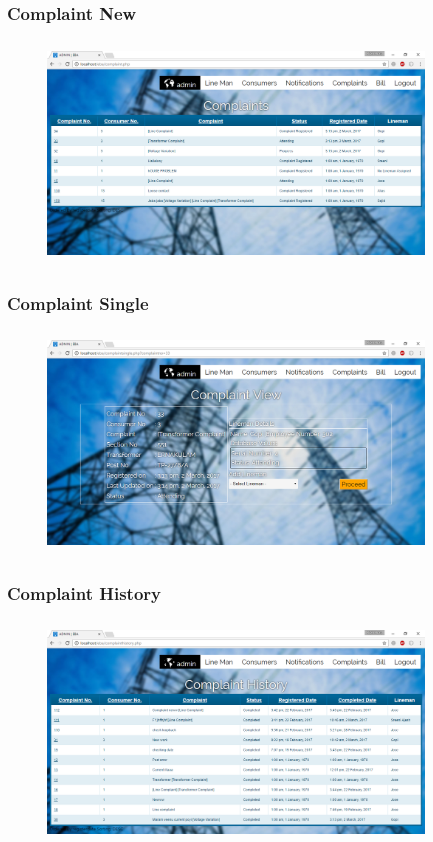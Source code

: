 \documentclass{beamer} %
\theoremstyle{definition} %
\begin{document}
\begin{frame}
\frametitle{Complaint New}
\begin{figure}[center]
\includegraphics[width=10cm ,height=5.9cm]{complaintnew.png} 
\end{figure}
\end{frame}

\begin{frame}
\frametitle{Complaint Single}
\begin{figure}[center]
\includegraphics[width=10cm ,height=5.9cm]{complaintsingle.png} 
\end{figure}
\end{frame}

\begin{frame}
\frametitle{Complaint History}
\begin{figure}[center]
\includegraphics[width=10cm ,height=5.9cm]{complainthistory.png} 
\end{figure}
\end{frame}
\end{document}

